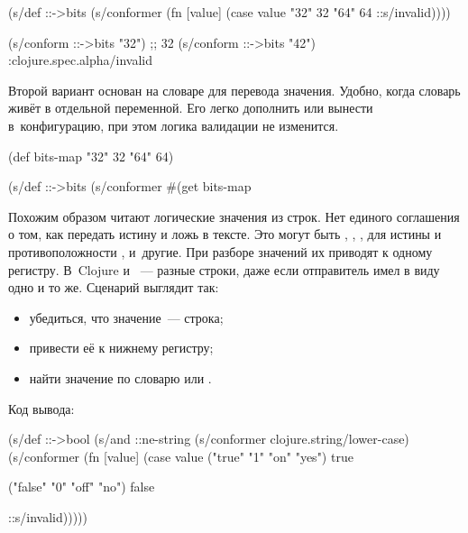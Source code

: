 \else


\begin{clojure}
(s/def ::->bits
  (s/conformer
   (fn [value]
     (case value
       "32" 32 "64" 64
       ::s/invalid))))

(s/conform ::->bits "32") ;; 32
(s/conform ::->bits "42") :clojure.spec.alpha/invalid
\end{clojure}


\fi


Второй вариант основан на словаре для перевода значения. Удобно, когда словарь
живёт в отдельной переменной. Его легко дополнить или вынести в~конфигурацию,
при этом логика валидации не изменится.


\begin{clojure}
(def bits-map {"32" 32 "64" 64})

(s/def ::->bits
  (s/conformer
   #(get bits-map %
\end{clojure}


Похожим образом читают логические значения из строк. Нет единого соглашения о
том, как передать истину и ложь в тексте. Это могут быть ,
, ,  для истины и противоположности ,
 и~другие. При разборе значений их приводят к одному
регистру. В~Clojure  и ~--- разные строки, даже если
отправитель имел в виду одно и то же. Сценарий выглядит так:

\begin{itemize}

\item
  убедиться, что значение~--- строка;

\item
  привести её к нижнему регистру;

\item
  найти значение по словарю или .

\end{itemize}

\noindent
Код вывода:

\ifnarrow


\begin{clojure}
(s/def ::->bool
  (s/and
   ::ne-string
   (s/conformer
     clojure.string/lower-case)
   (s/conformer
    (fn [value]
      (case value
        ("true" "1" "on" "yes")
        true

        ("false" "0" "off" "no")
        false

        ::s/invalid)))))

\end{clojure}


